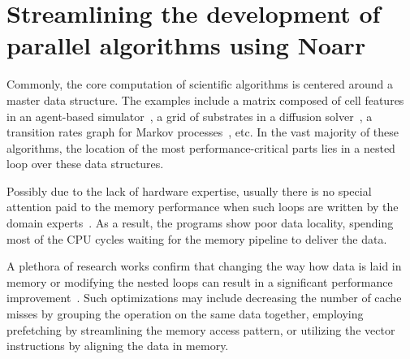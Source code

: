 \chapter{Streamlining the development of parallel algorithms using Noarr}
\label{chap:noarr}





Commonly, the core computation of scientific algorithms is centered around a master data structure. The examples include a matrix composed of cell features in an agent-based simulator~\cite{ghaffarizadeh2018physicell}, a grid of substrates in a diffusion solver~\cite{ghaffarizadeh2016biofvm}, a transition rates graph for Markov processes~\cite{koltai2020exact}, etc. In the vast majority of these algorithms, the location of the most performance-critical parts lies in a nested loop over these data structures.

Possibly due to the lack of hardware expertise, usually there is no special attention paid to the memory performance when such loops are written by the domain experts~\cite{clauss2000automatic}. As a result, the programs show poor data locality, spending most of the CPU cycles waiting for the memory pipeline to deliver the data.

A plethora of research works confirm that changing the way how data is laid in memory or modifying the nested loops can result in a significant performance improvement~\cite{gong2018empirical,stengel2015quantifying,serpa2019memory}. Such optimizations may include decreasing the number of cache misses by grouping the operation on the same data together, employing prefetching by streamlining the memory access pattern, or utilizing the vector instructions by aligning the data in memory.

